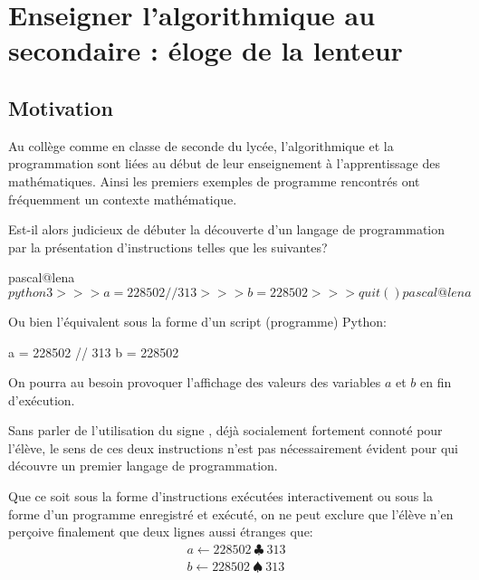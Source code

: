 \chapter{Enseigner l'algorithmique au secondaire : éloge de la lenteur}


\section{Motivation}

Au collège comme en classe de seconde du lycée, l'algorithmique et la programmation sont liées au début de leur enseignement à l'apprentissage des mathématiques. Ainsi les premiers exemples de programme rencontrés ont fréquemment un contexte mathématique.

Est-il alors judicieux de débuter la découverte d'un langage de programmation par la présentation d'instructions telles que les suivantes?

\begin{bash}
pascal@lena$ python3
>>> a = 228502 // 313
>>> b = 228502 %
>>> quit()
pascal@lena$ 
\end{bash}

Ou bien l'équivalent sous la forme d'un script (programme) Python:

\begin{python}[essai.py]
a = 228502 // 313
b = 228502 %
\end{python}


On pourra au besoin provoquer l'affichage des valeurs des variables $a$ et $b$ en fin d'exécution.

Sans parler de l'utilisation du signe \frquote{\%}, déjà socialement fortement connoté pour l'élève, le sens de ces deux instructions n'est pas nécessairement évident pour qui découvre un premier langage de programmation.

Que ce soit sous la forme d'instructions exécutées interactivement ou sous la forme d'un programme enregistré et exécuté, on ne peut exclure que l'élève n'en perçoive finalement que deux lignes aussi étranges que:
\[
\begin{array}{l}
a \leftarrow 228502\ \clubsuit\ 313 \\
b \leftarrow 228502\ \spadesuit\ 313 \\
\end{array}
\]

